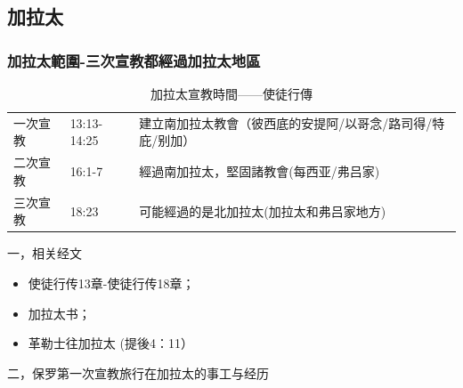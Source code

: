 \subsection{加拉太}
\subsubsection{加拉太範圍-三次宣教都經過加拉太地區}
\begin{table}[H]
\begin{center} 
\begin{tabular}{ p{}| p{2.5cm}|p{10cm}} 
\toprule 
一次宣教 &13:13-14:25 &建立南加拉太教會（彼西底的安提阿/以哥念/路司得/特庇/别加）\\
二次宣教 &16:1-7&經過南加拉太，堅固諸教會(每西亚/弗吕家)\\
三次宣教 &18:23 &可能經過的是北加拉太(加拉太和弗吕家地方) \\
\bottomrule 
\end{tabular}
\caption{加拉太宣教時間——使徒行傳}
\end{center}
\end{table}

一，相关经文
\begin{itemize} 
\itemsep-.5em 
\item 使徒行传13章-使徒行传18章；
\item 加拉太书；
\item 革勒士往加拉太 (提後4：11）
\end{itemize}

二，保罗第一次宣教旅行在加拉太的事工与经历

